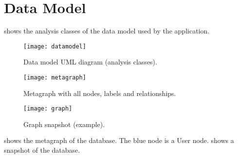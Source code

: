 \chapter{Data Model}\label{ch:datamodel}

 shows the analysis classes of the data model used by the
application.

\begin{figure}[htb]
	\texttt{[image: datamodel]}
	\caption{Data model UML diagram (analysis classes).}\label{fig:datamodel}
\end{figure}

\begin{figure}[htb]
	\centering
	\texttt{[image: metagraph]}
	\caption{Metagraph with all nodes, labels and
	relationships.}\label{fig:metagraph}
\end{figure}

\begin{figure}[htb]
	\centering
	\texttt{[image: graph]}
	\caption{Graph snapshot (example).}\label{fig:graphsnapshot}
\end{figure}

 shows the metagraph of the database. The blue node is a
User node.  shows a snapshot of the database.

